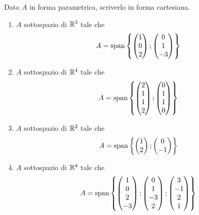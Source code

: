 \begin{exercise}
    Dato $A$ in forma parametrica, scriverlo in forma cartesiana.

    \begin{enumerate}[(1)]
        \item $A$ sottospazio di $\mathbb{R}^3$ tale che \[
            A = \operatorname{span}\left\{\begin{pmatrix} 1 \\ 0 \\ 2 \end{pmatrix}; \begin{pmatrix} 0 \\ 1 \\ -3 \end{pmatrix}\right\}
        \]
        \item $A$ sottospazio di $\mathbb{R}^4$ tale che \[
            A = \operatorname{span}\left\{\begin{pmatrix} 2 \\ 1 \\ 1 \\ 2\end{pmatrix}; \begin{pmatrix} 0 \\ 1 \\ 1 \\ 0 \end{pmatrix}\right\}
        \]
        \item $A$ sottospazio di $\mathbb{R}^2$ tale che \[
            A = \operatorname{span}\left\{\begin{pmatrix} 1 \\ 2 \end{pmatrix}; \begin{pmatrix} 0 \\ -1 \end{pmatrix}\right\}
        \]
        \item $A$ sottospazio di $\mathbb{R}^4$ tale che \[
            A = \operatorname{span}\left\{\begin{pmatrix} 1 \\ 0 \\ 2 \\ -3 \end{pmatrix}; \begin{pmatrix} 0 \\ 1 \\ -3 \\ 2 \end{pmatrix}; \begin{pmatrix} 3 \\ -1 \\ 2 \\ 1 \end{pmatrix}\right\}
        \]
    \end{enumerate}
\end{exercise}